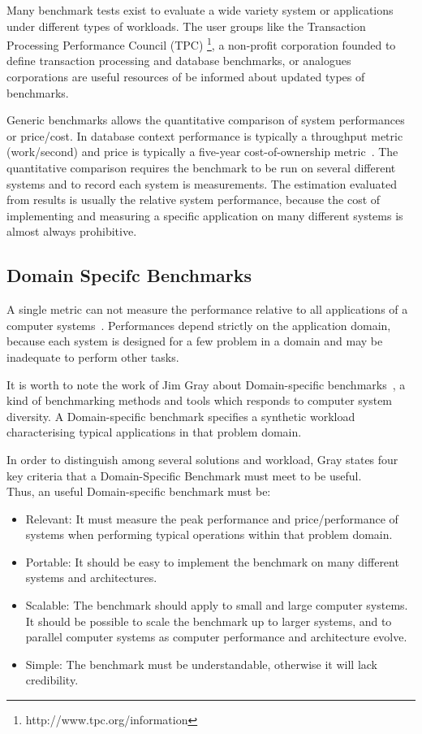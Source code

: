 Many benchmark tests exist to evaluate a wide variety system or applications under different types of workloads. The user groups like the Transaction Processing Performance Council (TPC) \footnote{http://www.tpc.org/information}, a non-profit corporation founded to define transaction processing and database benchmarks, or analogues corporations are useful resources of be informed about updated types of benchmarks. 

Generic benchmarks allows the quantitative comparison of system performances or price/cost. In database context performance is typically a throughput metric (work/second) and price is typically a five-year cost-of-ownership metric~\cite{DBLP:books/mk/Gray93}. The quantitative comparison requires the benchmark to be run on several different systems and to record each system is measurements.  The estimation evaluated from results is usually the relative system performance, because the cost of implementing and measuring a specific application on many different systems is almost always prohibitive.

\subsection{Domain Specifc Benchmarks}  \label{sec:tcp}

A single metric can not measure the performance relative to all applications of a computer systems~\cite{DBLP:books/mk/Gray93}. Performances depend strictly on the application domain, because each system is designed for a few problem in a domain and may be inadequate to perform other tasks.

It is worth to note the work of Jim Gray about Domain-specific benchmarks~\cite{DBLP:books/mk/Gray93}, a kind of benchmarking methods and tools  which responds to computer system diversity. A Domain-specific benchmark specifies a synthetic workload characterising typical applications in that problem domain. 

In order to distinguish among several solutions and workload, Gray states four key criteria that a Domain-Specific Benchmark must meet to be useful.\\

Thus, an useful Domain-specific benchmark must be:
\begin{itemize}
\item Relevant: It must measure the peak performance and price/performance of systems when performing typical operations within that problem domain.
\item Portable: It should be easy to implement the benchmark on many different systems and architectures.
\item Scalable: The benchmark should apply to small and large computer systems. It should be possible to scale the benchmark up to larger systems, and to parallel computer systems as computer performance and architecture evolve.
\item Simple: The benchmark must be understandable, otherwise it will lack credibility.
\end{itemize} 

